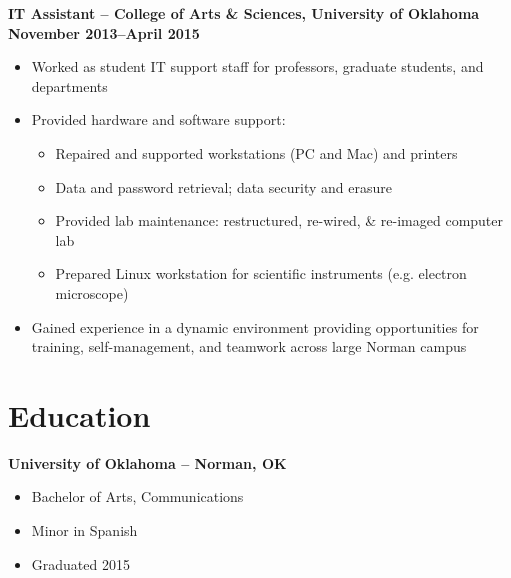 \documentclass[line]{res}
\begin{document}
\begin{resume}
\begin{itemize}
	\end{itemize}
\textbf{IT Assistant -- College of Arts \& Sciences, University of Oklahoma}
\newline
\textbf{November 2013--April 2015}
	\begin{itemize}
		\item Worked as student IT support staff for professors, graduate students, and departments
		\item Provided hardware and software support:
			\begin{itemize}
				\item Repaired and supported workstations (PC and Mac) and printers
				\item Data and password retrieval; data security and erasure
				\item Provided lab maintenance: restructured, re-wired, \& re-imaged computer lab
				\item Prepared Linux workstation for scientific instruments (e.g. electron microscope)
			\end{itemize}
		\item Gained experience in a dynamic environment providing opportunities for training, self-management, and teamwork across large Norman campus
	\end{itemize}


\section{Education}
\textbf{University of Oklahoma -- Norman, OK}
	\begin{itemize}
		\item Bachelor of Arts, Communications
		\item Minor in Spanish
		\item Graduated 2015
	\end{itemize}

\end{resume}
\end{document}
